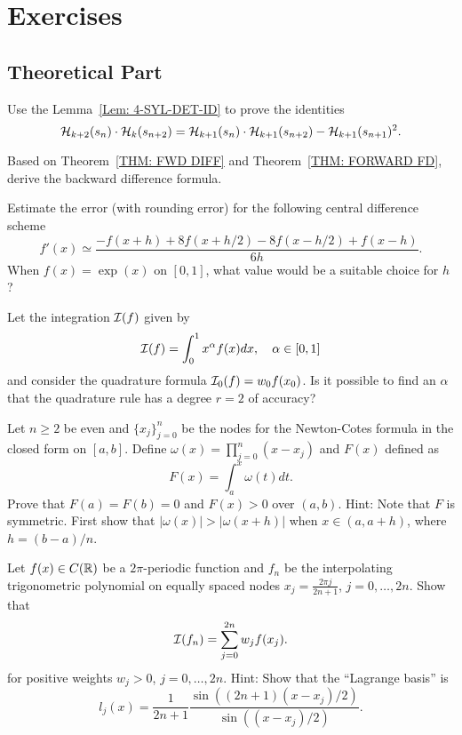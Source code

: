 \begin{example}
    
\end{example}

\section{Exercises}

\subsection{Theoretical Part}
\begin{problem}
    Use the Lemma~\ref{Lem: 4-SYL-DET-ID} to prove the identities
    \begin{equation}
    \mathcal H_{k+2}(s_n) \cdot \mathcal H_{k}(s_{n+2}) = \mathcal H_{k+1}(s_n) \cdot \mathcal H_{k+1}(s_{n+2}) - \mathcal H_{k+1}(s_{n+1}) ^2 .
    \end{equation}
\end{problem}
\begin{problem}
\label{Prb: 3-Bac-Dif}
    Based on Theorem~\ref{THM: FWD DIFF} and Theorem~\ref{THM: FORWARD FD}, derive the backward difference formula.
\end{problem}
\begin{problem}
    Estimate the error (with rounding error) for the following central difference scheme
    $$f'(x)\simeq \frac{-f(x + h) + 8f(x + h/2) - 8 f(x - h/2) + f(x - h)}{6h}.$$
    When $f(x)=\exp(x)$ on $[0, 1]$, what value would be a suitable choice for $h$?
\end{problem}
\begin{problem}
    Let the integration $\mathcal I(f)$ given by
    $$\mathcal I(f) = \int_0^1 x^{\alpha} f(x) dx,\quad \alpha\in [0, 1]$$
    and consider the quadrature formula $\mathcal I_0(f) = w_0 f(x_0)$. Is it possible to find an $\alpha$ that the quadrature rule has a degree $r= 2$ of accuracy?
\end{problem}
\begin{problem}
\label{Prb: 3-Exe-4}
    Let $n\ge 2$ be even and $\{ x_j\}_{j=0}^n$ be the nodes for the Newton-Cotes formula in the closed form on $[a, b]$. Define $\omega(x)=\prod_{j=0}^n (x - x_j)$ and $F(x)$ defined as 
    $$F(x) = \int_a^x \omega(t)dt.$$
    Prove that $F(a) = F(b) = 0$ and $F(x) > 0$ over $(a ,b)$. 
    Hint: Note that $F$ is symmetric. First show that $|\omega(x)| > |\omega(x + h)|$ when $x\in (a, a + h)$, where $h = (b-a)/n$.
\end{problem}
\begin{problem}
    Let $f(x)\in C(\mathbb R)$ be a $2\pi$-periodic function and $f_n$ be the interpolating trigonometric polynomial on equally spaced nodes $x_j = \frac{2\pi j}{2n+1}$, $j=0,\dots, 2n$. Show that 
    \begin{equation}
       \mathcal I(f_n) = \sum_{j=0}^{2n} w_j f(x_j).
    \end{equation}
    for positive weights $w_j > 0$, $j = 0,\dots, 2n$.
    Hint: Show that the ``Lagrange basis'' is $$l_j(x) =\frac{1}{2n+1} \frac{\sin((2n+1)(x- x_j)/2)}{\sin((x-x_j)/2)}.$$
\end{problem}
